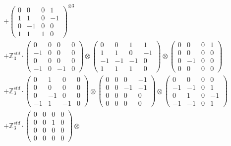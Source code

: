 \documentclass{article}
\begin{document}
{\begin{align}
        &+ \label{Rs16-Rc11-Solution-28-c16} \begin{pmatrix} 0 & 0 & 0 & 1 \\ 1 & 1 & 0 & -1 \\ 0 & -1 & 0 & 0 \\ 1 & 1 & 1 & 0 \end{pmatrix}^{\otimes 3} \\
        &+ \label{Rs16-Rc11-Solution-28-c17} \mathbb{Z}_3^{std} \cdot 
            \begin{pmatrix} 0 & 0 & 0 & 0 \\ -1 & 0 & 0 & 0 \\ 0 & 0 & 0 & 0 \\ -1 & 0 & -1 & 0 \end{pmatrix} \otimes 
            \begin{pmatrix} 0 & 0 & 1 & 1 \\ 1 & 1 & 0 & -1 \\ -1 & -1 & -1 & 0 \\ 1 & 1 & 1 & 0 \end{pmatrix} \otimes 
            \begin{pmatrix} 0 & 0 & 0 & 1 \\ 0 & 0 & 0 & 0 \\ 0 & -1 & 0 & 0 \\ 0 & 0 & 0 & 0 \end{pmatrix} \\ 
        &+ \label{Rs16-Rc11-Solution-28-c18} \mathbb{Z}_3^{std} \cdot 
            \begin{pmatrix} 0 & 1 & 0 & 0 \\ 0 & 0 & 0 & 0 \\ 0 & -1 & 0 & 0 \\ -1 & 1 & -1 & 0 \end{pmatrix} \otimes 
            \begin{pmatrix} 0 & 0 & 0 & -1 \\ 0 & 0 & -1 & -1 \\ 0 & 0 & 0 & 0 \\ 0 & 0 & 0 & 0 \end{pmatrix} \otimes 
            \begin{pmatrix} 0 & 0 & 0 & 0 \\ -1 & -1 & 0 & 1 \\ 0 & 1 & 0 & -1 \\ -1 & -1 & 0 & 1 \end{pmatrix} \\ 
        &+ \label{Rs16-Rc11-Solution-28-c19} \mathbb{Z}_3^{std} \cdot 
            \begin{pmatrix} 0 & 0 & 0 & 0 \\ 0 & 0 & 1 & 0 \\ 0 & 0 & 0 & 0 \\ 0 & 0 & 0 & 0 \end{pmatrix} \otimes 

\end{align}}
\end{document}
